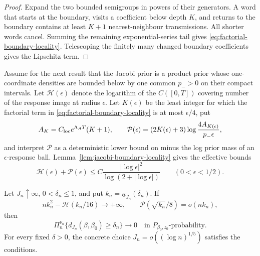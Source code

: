 \begin{proof}
Expand the two bounded semigroups in powers of their generators.  A word that
starts at the boundary, visits a coefficient below depth \(K\), and returns
to the boundary contains at least \(K+1\) nearest-neighbour transmissions.
All shorter words cancel.  Summing the remaining exponential-series tail
gives \eqref{eq:factorial-boundary-locality}.  Telescoping the finitely many
changed boundary coefficients gives the Lipschitz term.
\end{proof}

Assume for the next result that the Jacobi prior is a product prior whose
one-coordinate densities are bounded below by one common \(p_->0\) on their
compact intervals.  Let \(\mathcal H(\epsilon)\) denote the logarithm of the
\(C([0,T])\) covering number of the response image at radius \(\epsilon\).
Let \(K(\epsilon)\) be the least integer for which the factorial term in
\eqref{eq:factorial-boundary-locality} is at most \(\epsilon/4\), put
\[
 A_K=C_{\rm loc}e^{\Lambda_AT}(K+1),
 \qquad
 \mathcal P(\epsilon)=(2K(\epsilon)+3)
   \log\frac{4A_{K(\epsilon)}}{p_-\epsilon},
\]
and interpret \(\mathcal P\) as a deterministic lower bound on minus the log
prior mass of an \(\epsilon\)-response ball.  Lemma~\ref{lem:jacobi-boundary-locality}
gives the effective bounds
\begin{equation}
 \mathcal H(\epsilon)+\mathcal P(\epsilon)
 \le C\frac{|\log\epsilon|^2}{\log(2+|\log\epsilon|)}
 \qquad(0<\epsilon<1/2).
 \label{eq:response-entropy-bound}
\end{equation}

\begin{theorem}
\label{thm:growing-depth-recovery}
Let \(J_n\uparrow\infty\), \(0<\delta_n\le1\), and put
\(k_n=\underline\kappa_{J_n}(\delta_n)\).  If
\begin{equation}
 n k_n^2-\mathcal H(k_n/16)\longrightarrow+\infty,
 \qquad
 \mathcal P(\sqrt{k_n}/8)=o(nk_n),
 \label{eq:growing-depth-conditions}
\end{equation}
then
\begin{equation}
 \Pi_n^{\nu_n}\{d_{J_n}(\beta,\beta_0)\ge\delta_n\}
 \longrightarrow0
 \quad\text{in }P_{\beta_0,z_0}\text{-probability}.
 \label{eq:growing-depth-contraction}
\end{equation}
For every fixed \(\delta>0\), the concrete choice
\(J_n=o((\log n)^{1/5})\) satisfies the conditions.
\end{theorem}

